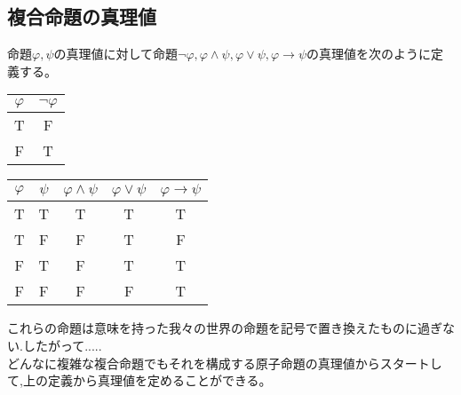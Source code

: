 \documentclass[10pt,b5paper,papersize,dvipdfmx]{jsbook}
\begin{document}
\subsection{複合命題の真理値}
命題$\varphi,\psi$の真理値に対して命題$\lnot\varphi,\varphi\land\psi,\varphi\lor\psi,\varphi\to\psi$の真理値を次のように定義する。\\
\begin{table}[H]
\begin{minipage}[t]{.45\textwidth}
\begin{center}
\begin{tabular}{|c||c|}\hline
$\varphi$&$\lnot\varphi$ \\ \hline \hline
T&F \\ \hline
F&T \\ \hline
\end{tabular}
\end{center}
\end{minipage}
\hfill
\begin{minipage}[t]{.45\textwidth}
\begin{center}
\begin{tabular}{|c|c||c|c|c|}\hline
$\varphi$&$\psi$&$\varphi\land\psi$&$\varphi\lor\psi$&$\varphi\to\psi$ \\ \hline \hline
T&T&T&T&T \\ \hline
T&F&F&T&F \\ \hline
F&T&F&T&T \\ \hline
F&F&F&F&T \\ \hline
\end{tabular}
\end{center}
\end{minipage}
\end{table}
これらの命題は意味を持った我々の世界の命題を記号で置き換えたものに過ぎない.したがって.....\\
どんなに複雑な複合命題でもそれを構成する原子命題の真理値からスタートして,上の定義から真理値を定めることができる。
\end{document}
